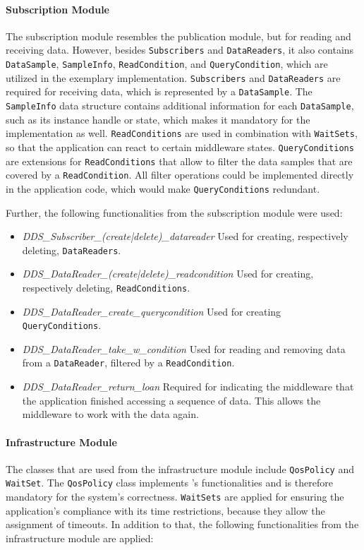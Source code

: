 \paragraph{Subscription Module}
The subscription module resembles the publication module, but for reading and receiving data.
However, besides \texttt{Subscribers} and \texttt{DataReaders}, it also contains \texttt{DataSample}, \texttt{SampleInfo}, \texttt{ReadCondition}, and \texttt{QueryCondition}, which are utilized in the exemplary implementation.
\texttt{Subscribers} and \texttt{DataReaders} are required for receiving data, which is represented by a \texttt{DataSample}.
The \texttt{SampleInfo} data structure contains additional information for each \texttt{DataSample}, such as its instance handle or state, which makes it mandatory for the implementation as well.
\texttt{ReadConditions} are used in combination with \texttt{WaitSets}, so that the application can react to certain middleware states.
\texttt{QueryConditions} are extensions for \texttt{ReadConditions} that allow to filter the data samples that are covered by a \texttt{ReadCondition}.
All filter operations could be implemented directly in the application code, which would make \texttt{QueryConditions} redundant.

Further, the following functionalities from the subscription module were used:

\begin{itemize}
\item \textit{DDS\_Subscriber\_(create|delete)\_datareader} Used for creating, respectively deleting, \texttt{DataReaders}.
\item \textit{DDS\_DataReader\_(create|delete)\_readcondition} Used for creating, respectively deleting, \texttt{ReadConditions}.
\item \textit{DDS\_DataReader\_create\_querycondition} Used for creating \texttt{QueryConditions}.
\item \textit{DDS\_DataReader\_take\_w\_condition} Used for reading and removing data from a \texttt{DataReader}, filtered by a \texttt{ReadCondition}.
\item \textit{DDS\_DataReader\_return\_loan} Required for indicating the middleware that the application finished accessing a sequence of data. This allows the middleware to work with the data again.
\end{itemize}

\paragraph{Infrastructure Module}
The classes that are used from the infrastructure module include \texttt{QosPolicy} and \texttt{WaitSet}.
The \texttt{QosPolicy} class implements 's  functionalities and is therefore mandatory for the system's correctness.
\texttt{WaitSets} are applied for ensuring the application's compliance with its time restrictions, because they allow the assignment of timeouts.
In addition to that, the following functionalities from the infrastructure module are applied:


